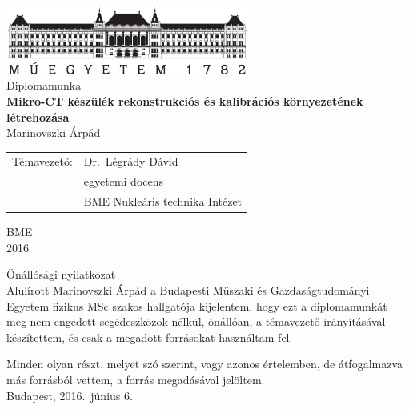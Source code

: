 \documentclass[a4paper,12pt]{article}
\begin{document}
\frenchspacing



 \begin{center} \includegraphics[width=80mm,keepaspectratio]{abrak/bmelogo.jpg}\\ \vspace{0.3cm}  \Large Diplomamunka \\[1.5cm] \vspace{0.5cm} { \large \textbf{ Mikro-CT készülék rekonstrukciós és kalibrációs környezetének létrehozása}}\\[2.5cm] \vspace{0.2cm} \large Marinovszki Árpád\\[5cm] \begin{tabular}{ll} Témavezető: & Dr.\ Légrády Dávid \\ & egyetemi docens \\ & BME Nukleáris technika Intézet \\ \end{tabular} \vfill \large BME \\ \large 2016 \end{center} 
 
 \clearpage \setcounter{page}{1}
 
   

\clearpage

{\large Önállósági nyilatkozat}
\\[0.5cm]



Alulírott Marinovszki Árpád a Budapesti Műszaki és Gazdaságtudományi Egyetem fizikus MSc szakos hallgatója kijelentem, hogy ezt a diplomamunkát meg nem engedett segédeszközök nélkül, önállóan, a témavezető irányításával készítettem, és csak a megadott forrásokat használtam fel. 


Minden olyan részt, melyet szó szerint, vagy azonos értelemben, de átfogalmazva más forrásból vettem, a forrás megadásával jelöltem.
\\[0.3cm]

Budapest, 2016.\ június 6.

\hspace{9cm}\makebox[1.5in]{\hrulefill}
\end{document}
